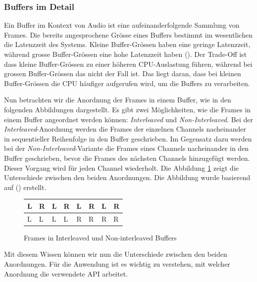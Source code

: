 \documentclass[11pt,a4paper]{article}
\begin{document}
\subsubsection{Buffers im Detail}
Ein Buffer im Kontext von Audio ist eine aufeinanderfolgende Sammlung von Frames. Die bereits
angesprochene Grösse eines Buffers bestimmt im wesentlichen die Latenzzeit des Systems. Kleine
Buffer-Grössen haben eine geringe Latenzzeit, während grosse Buffer-Grössen eine hohe Latenzzeit 
haben (\cite[p.10]{somberg2019audioapi}). Der Trade-Off ist dass kleine Buffer-Grössen 
zu einer höheren CPU-Auslastung führen, während bei grossen Buffer-Grössen das nicht der Fall ist.
Das liegt daran, dass bei kleinen Buffer-Grössen die CPU häufiger aufgerufen wird, um die Buffers
zu verarbeiten. 

\noindent
\newline
Nun betrachten wir die Anordnung der Frames in einem Buffer, wie in den folgenden Abbildungen 
dargestellt. Es gibt zwei Möglichkeiten, wie die Frames in einem Buffer angeordnet werden 
können: \textit{Interleaved} und \textit{Non-Interleaved}. Bei der \textit{Interleaved}-Anordnung 
werden die Frames der einzelnen Channels nacheinander in sequentieller Reihenfolge in den Buffer 
geschrieben. Im Gegensatz dazu werden bei der \textit{Non-Interleaved}-Variante die Frames 
eines Channels nacheinander in den Buffer geschrieben, bevor die Frames des nächsten Channels 
hinzugefügt werden. Dieser Vorgang wird für jeden Channel wiederholt. Die Abbildung 
\ref{fig:frames_buffers} zeigt die Unterschiede zwischen den beiden Anordnungen. Die Abbildung 
wurde basierend auf (\cite[p.11]{somberg2019audioapi}) erstellt.


\begin{figure}[h]
    \centering
    \begin{tabularx}{\textwidth}{|X|X|X|X|X|X|X|X|}
    \hline
    L & R & L & R & L & R & L & R \\
    \hline
    L & L & L & L & R & R & R & R \\
    \hline
    \end{tabularx}

    
    \caption{Frames in Interleaved und Non-interleaved Buffers}
    \label{fig:frames_buffers}
\end{figure}

\noindent
\newline
Mit diesem Wissen können wir nun die Unterschiede zwischen den beiden Anordnungen. Für die 
Anwendung ist es wichtig zu verstehen, mit welcher Anordnung die verwendete API arbeitet.
\end{document}
